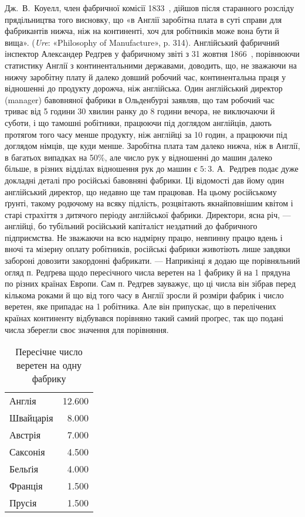 Дж.~В.~Коуелл, член фабричної комісії 1833~, дійшов після
старанного розсліду прядільництва того висновку, що «в Англії
заробітна плата в суті справи для фабрикантів нижча, ніж на
континенті, хоч для робітників може вона бути й вища». (\emph{Ure}:
«Philosophy of Manufacture», p. 314). Англійський фабричний
інспектор Александер Редґрев у фабричному звіті з 31 жовтня
1866~, порівнюючи статистику Англії з континентальними державами,
доводить, що, не зважаючи на нижчу заробітну плату
й далеко довший робочий час, континентальна праця у відношенні
до продукту дорожча, ніж англійська. Один англійський
директор (manager) бавовняної фабрики в Ольденбурзі заявляв,
що там робочий час триває від 5 години 30 хвилин ранку до
8 години вечора, не виключаючи й суботи, і що тамошні робітники,
працюючи під доглядом англійців, дають протягом того часу
менше продукту, ніж англійці за 10 годин, а працюючи під
доглядом німців, ще куди менше. Заробітна плата там далеко
нижча, ніж в Англії, в багатьох випадках на 50\%, але число
рук у відношенні до машин далеко більше, в різних відділах
відношення рук до машин є $5: 3$. А.~Редґрев подає дуже докладні
деталі про російські бавовняні фабрики. Ці відомості дав йому
один англійський директор, що недавно ще там працював. На
цьому російському ґрунті, такому родючому на всяку підлість,
розцвітають якнайповнішим квітом і старі страхіття з дитячого
періоду англійської фабрики. Директори, ясна річ, — англійці,
бо тубільний російський капіталіст нездатний до фабричного
підприємства. Не зважаючи на всю надмірну працю, невпинну
працю вдень і вночі та мізерну оплату робітників, російські фабрики
животіють лише завдяки забороні довозити закордонні фабрикати.
— Наприкінці я додаю ще порівняльний огляд п. Редґрева
щодо пересічного числа веретен на 1 фабрику й на 1 прядуна
по різних країнах Европи. Сам п. Редґрев зауважує, що ці
числа він зібрав перед кількома роками й що від того часу в Англії
зросли й розміри фабрик і число веретен, яке припадає на 1 робітника.
Але він припускає, що в перелічених країнах континенту
відбувався порівняно такий самий проґрес, так що подані
числа зберегли своє значення для порівняння.


\begin{table}[H]
    \centering
    \caption*{Пересічне число веретен на одну фабрику}
    \begin{tabularx}{0.5\textwidth}{Xr}
        Англія\dotfill{} & \num{12.600} \\
        Швайцарія\dotfill{} & \num{8.000} \\
        Австрія\dotfill{} & \num{7.000} \\
        Саксонія\dotfill{} & \num{4.500} \\
        Бельґія\dotfill{} & \num{4.000} \\
        Франція\dotfill{} & \num{1.500} \\
        Прусія\dotfill{} & \num{1.500} \\
    \end{tabularx}
\end{table}

